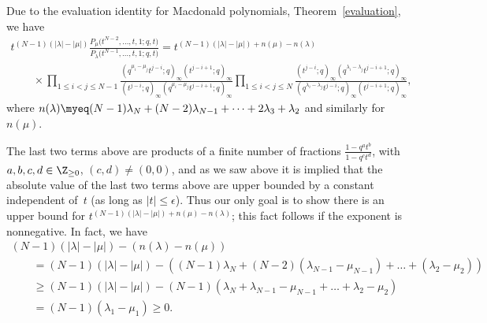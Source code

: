 Due to the evaluation identity for Macdonald polynomials, Theorem~\ref{evaluation}, we have
\begin{gather*}
t^{(N-1)(|\lambda| - |\mu|)}\frac{P_{\mu}\big(t^{N-2}, \dots, t, 1; q, t\big)}{P_{\lambda}\big(t^{N-1}, \dots, t, 1; q, t\big)} = t^{(N-1)(|\lambda| - |\mu|) + n(\mu) - n(\lambda)} \\
\qquad{} \times\prod_{1\leq i < j\leq N-1}{\frac{(q^{\mu_i - \mu_j}t^{j-i}; q)_{\infty}(t^{j-i+1}; q)_{\infty}}{(t^{j-i}; q)_{\infty}(q^{\mu_i - \mu_j}t^{j-i+1}; q)_{\infty}}}\prod_{1\leq i < j\leq N}{\frac{(t^{j-i}; q)_{\infty}(q^{\lambda_i - \lambda_j}t^{j-i+1}; q)_{\infty}}{(q^{\lambda_i - \lambda_j}t^{j-i}; q)_{\infty}(t^{j-i+1}; q)_{\infty}}},
\end{gather*}
where $n(\lambda) \myeq (N-1)\lambda_N + (N-2)\lambda_{N-1} + \dots + 2\lambda_3 + \lambda_2$ and similarly for $n(\mu)$.

The last two terms above are products of a f\/inite number of fractions $\frac{1 - q^at^b}{1 - q^ct^d}$, with $a, b, c, d\in\Z_{\geq 0}$, $(c, d)\neq (0, 0)$, and as we saw above it is implied that the absolute value of the last two terms above are upper bounded by a constant independent of~$t$ (as long as $|t| \leq \epsilon$). Thus our only goal is to show there is an upper bound for $t^{(N-1)(|\lambda| - |\mu|) + n(\mu) - n(\lambda)}$; this fact follows if the exponent is nonnegative. In fact, we have
\begin{gather*}
(N - 1)(|\lambda| - |\mu|) - (n(\lambda) - n(\mu)) \\
\qquad{} =(N - 1)(|\lambda| - |\mu|) - ((N - 1)\lambda_N + (N - 2)(\lambda_{N-1} - \mu_{N-1}) + \dots + (\lambda_2 - \mu_2)) \\
\qquad {} \geq (N-1)(|\lambda| - |\mu|) - (N-1)(\lambda_N + \lambda_{N-1} - \mu_{N-1} + \dots + \lambda_2 - \mu_2)\\
\qquad{} = (N - 1)(\lambda_1 - \mu_1)\geq 0.
\end{gather*}

